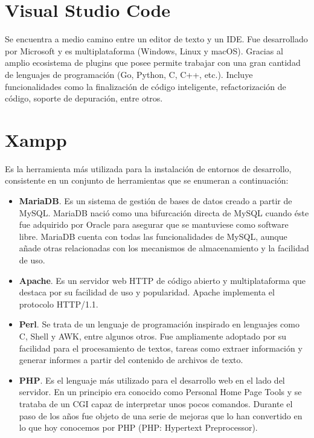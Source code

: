 \section{Visual Studio Code}

Se encuentra a medio camino entre un editor de texto y un IDE. Fue desarrollado por Microsoft y es multiplataforma (Windows, Linux y macOS). Gracias al amplio ecosistema de plugins que posee permite trabajar con una gran cantidad de lenguajes de programación (Go, Python, C, C++, etc.). Incluye funcionalidades como la finalización de código inteligente, refactorización de código, soporte de depuración, entre otros.

\section{Xampp}

Es la herramienta más utilizada para la instalación de entornos de desarrollo, consistente en un conjunto de herramientas que se enumeran a continuación:

\begin{itemize}
    \item \textbf{MariaDB}. Es un sistema de gestión de bases de datos creado a partir de MySQL. MariaDB nació como una bifurcación directa de MySQL cuando éste fue adquirido por Oracle para asegurar que se mantuviese como software libre. MariaDB cuenta con todas las funcionalidades de MySQL, aunque añade otras relacionadas con los mecanismos de almacenamiento y la facilidad de uso.  
    \item \textbf{Apache}. Es un servidor web HTTP de código abierto y multiplataforma que destaca por su facilidad de uso y popularidad. Apache implementa el protocolo HTTP/1.1.
    \item \textbf{Perl}. Se trata de un lenguaje de programación inspirado en lenguajes como C, Shell y AWK, entre algunos otros. Fue ampliamente adoptado por su facilidad para el procesamiento de textos, tareas como extraer información y generar informes a partir del contenido de archivos de texto.
    \item \textbf{PHP}. Es el lenguaje más utilizado para el desarrollo web en el lado del servidor. En un principio era conocido como Personal Home Page Tools y se trataba de un CGI capaz de interpretar unos pocos comandos. Durante el paso de los años fue objeto de una serie de mejoras que lo han convertido en lo que hoy conocemos por PHP (PHP: Hypertext Preprocessor).
\end{itemize}


